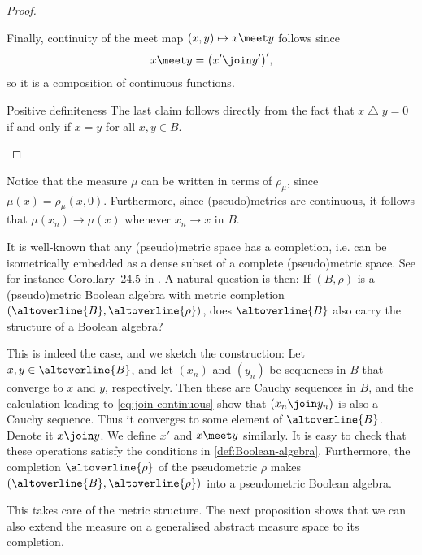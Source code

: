 \documentclass[article, a4paper, 11pt, oneside]{memoir}
\numberwithin{equation}{chapter}
\renewcommand{\symdiff}{\mathbin{\triangle}}
\begin{document}
\begin{proof}
\begin{proofsec}
    Finally, continuity of the meet map $(x,y) \mapsto x \meet y$ follows since
    \begin{equation*}
        x \meet y
            = \bigl( x' \join y' \bigr)',
    \end{equation*}
    so it is a composition of continuous functions.

    \item[Positive definiteness]
    The last claim follows directly from the fact that $x \symdiff y = 0$ if and only if $x = y$ for all $x,y \in B$.
\end{proofsec}
\end{proof}

\begin{remark}
    \label{rem:convergence-of-measure}
    Notice that the measure $\mu$ can be written in terms of $\rho_\mu$, since $\mu(x) = \rho_\mu(x,0)$. Furthermore, since (pseudo)metrics are continuous, it follows that $\mu(x_n) \to \mu(x)$ whenever $x_n \to x$ in $B$.
\end{remark}


It is well-known that any (pseudo)metric space has a completion, i.e. can be isometrically embedded as a dense subset of a complete (pseudo)metric space. See for instance Corollary~24.5 in \textcite{willard}. A natural question is then: If $(B,\rho)$ is a (pseudo)metric Boolean algebra with metric completion $(\altoverline{B}, \altoverline{\rho})$, does $\altoverline{B}$ also carry the structure of a Boolean algebra?

This is indeed the case, and we sketch the construction: Let $x,y \in \altoverline{B}$, and let $(x_n)$ and $(y_n)$ be sequences in $B$ that converge to $x$ and $y$, respectively. Then these are Cauchy sequences in $B$, and the calculation leading to \eqref{eq:join-continuous} show that $(x_n \join y_n)$ is also a Cauchy sequence. Thus it converges to some element of $\altoverline{B}$. Denote it $x \join y$. We define $x'$ and $x \meet y$ similarly. It is easy to check that these operations satisfy the conditions in \cref{def:Boolean-algebra}. Furthermore, the completion $\altoverline{\rho}$ of the pseudometric $\rho$ makes $(\altoverline{B}, \altoverline{\rho})$ into a pseudometric Boolean algebra.

This takes care of the metric structure. The next proposition shows that we can also extend the measure on a generalised abstract measure space to its completion.
\end{document}
